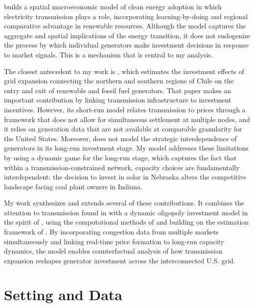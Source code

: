 \documentclass[12pt]{article}
\begin{document}
\cite{arkolakis2023clean} builds a spatial macroeconomic model of clean energy adoption in which electricity transmission plays a role, incorporating learning-by-doing and regional comparative advantage in renewable resources. Although the model captures the aggregate and spatial implications of the energy transition, it does not endogenize the process by which individual generators make investment decisions in response to market signals. This is a mechanism that is central to my analysis.
 
The closest antecedent to my work is \cite{gonzales2022dynamic}, which estimates the investment effects of grid expansion connecting the northern and southern regions of Chile on the entry and exit of renewable and fossil fuel generators. That paper makes an important contribution by linking transmission infrastructure to investment incentives. However, its short-run model relates transmission to prices through a framework that does not allow for simultaneous settlement at multiple nodes, and it relies on generation data that are not available at comparable granularity for the United States. Moreover, \cite{gonzales2022dynamic} does not model the strategic interdependence of generators in its long-run investment stage. My model addresses these limitations by using a dynamic game for the long-run stage, which captures the fact that within a transmission-constrained network, capacity choices are fundamentally interdependent: the decision to invest in solar in Nebraska alters the competitive landscape facing coal plant owners in Indiana.
 
My work synthesizes and extends several of these contributions. It combines the attention to transmission found in \cite{gonzales2022dynamic} with a dynamic oligopoly investment model in the spirit of \cite{elliott2022investment}, using the computational methods of \cite{gowrisankaran2024computable} and building on the estimation framework of \cite{pakes1998empirical}. By incorporating congestion data from multiple markets simultaneously and linking real-time price formation to long-run capacity dynamics, the model enables counterfactual analysis of how transmission expansion reshapes generator investment across the interconnected U.S. grid.


\section{Setting and Data} \label{sec:data}
\end{document}
